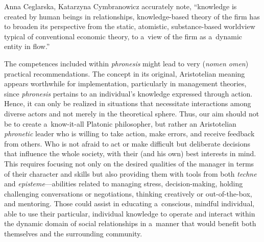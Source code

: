 \begin{artengenv2auth}{Anna Ceglarska, Katarzyna Cymbranowicz}
\parencite*[][p.242]{nonaka_managing_2008} %
 accurately note, ``knowledge is created by human beings in relationships, knowledge-based theory of the firm has to broaden its perspective from the static, atomistic, substance-based worldview typical of conventional economic theory, to a~view of the firm as a~dynamic entity in flow.''



The competences included within \textit{phronesis} might lead to very (\textit{nomen omen}) practical recommendations. The concept in its original, Aristotelian meaning appears worthwhile for implementation, particularly in management theories, since \textit{phronesis} pertains to an individual's knowledge expressed through action. Hence, it can only be realized in situations that necessitate interactions among diverse actors and not merely in the theoretical sphere. Thus, our aim should not be to create a~know-it-all Platonic philosopher, but rather an Aristotelian \textit{phronetic} leader who is willing to take action, make errors, and receive feedback from others. Who is not afraid to act or make difficult but deliberate decisions that influence the whole society, with their (and his own) best interests in mind. This requires focusing not only on the desired qualities of the manager in terms of their character and skills but also providing them with tools from both \textit{techne} and \textit{episteme}---abilities related to managing stress, decision-making, holding challenging conversations or negotiations, thinking creatively or out-of-the-box, and mentoring. Those could assist in educating a~conscious, mindful individual, able to use their particular, individual knowledge to operate and interact within the dynamic domain of social relationships in a~manner that would benefit both themselves and the surrounding community.



\end{artengenv2auth}

\label{ceglarska-lastpage}
